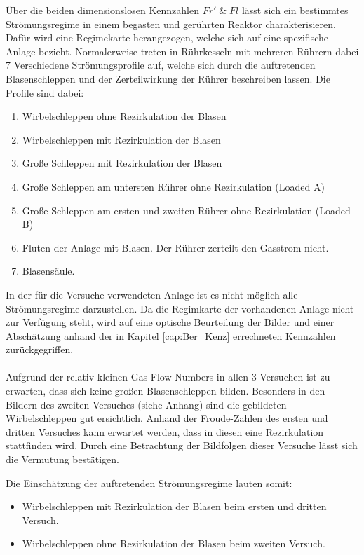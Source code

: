 \documentclass[12pt,liststotoc]{report}
\begin{document}
\label{Bestimmung_Strömung}Über die beiden dimensionslosen Kennzahlen $Fr'\;\&\; Fl$ lässt sich ein bestimmtes Strömungsregime in einem begasten und gerührten Reaktor charakterisieren. Dafür wird eine Regimekarte herangezogen, welche sich auf eine spezifische Anlage bezieht. Normalerweise treten in Rührkesseln mit mehreren Rührern dabei 7 Verschiedene Strömungsprofile auf, welche sich durch die auftretenden Blasenschleppen und der Zerteilwirkung der Rührer beschreiben lassen.
Die Profile sind dabei:
\begin{enumerate}
    \item Wirbelschleppen ohne Rezirkulation der Blasen
    \item Wirbelschleppen mit Rezirkulation der Blasen
    \item Große Schleppen mit Rezirkulation der Blasen
    \item Große Schleppen am untersten Rührer ohne Rezirkulation (Loaded A)
    \item Große Schleppen am ersten und zweiten Rührer ohne Rezirkulation (Loaded B)
    \item Fluten der Anlage mit Blasen. Der Rührer zerteilt den Gasstrom nicht. 
    \item Blasensäule.
\end{enumerate}
In der für die Versuche verwendeten Anlage ist es nicht möglich alle Strömungsregime darzustellen. Da die Regimkarte der vorhandenen Anlage nicht zur Verfügung steht, wird auf eine optische Beurteilung der Bilder und einer Abschätzung anhand der in Kapitel \ref{cap:Ber_Kenz} errechneten Kennzahlen zurückgegriffen.\\
\\
Aufgrund der relativ kleinen Gas Flow Numbers in allen 3 Versuchen ist zu erwarten, dass sich keine großen Blasenschleppen bilden. Besonders in den Bildern des zweiten Versuches (siehe Anhang) sind die gebildeten Wirbelschleppen gut ersichtlich.
Anhand der Froude-Zahlen des ersten und dritten Versuches kann erwartet werden, dass in diesen eine Rezirkulation stattfinden wird. Durch eine Betrachtung der Bildfolgen dieser Versuche lässt sich die Vermutung bestätigen.

Die Einschätzung der auftretenden Strömungsregime lauten somit:
\begin{itemize}
    \item Wirbelschleppen mit Rezirkulation der Blasen beim ersten und dritten Versuch.
    \item Wirbelschleppen ohne Rezirkulation der Blasen beim zweiten Versuch.
\end{itemize}
\end{document}
